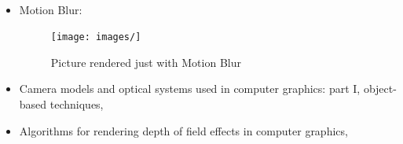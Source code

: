 \documentclass[11pt,a4paper]{article}
\begin{document}
\\
\begin{itemize}
\item
Motion Blur:\\
\begin{figure}[h]
\begin{center}
\texttt{[image: images/]}
\caption[Picture showing Motion Blur]{Picture rendered just with Motion Blur}
\label{fig:2}
\end{center}
\end{figure}
\item
Camera models and optical systems used in computer graphics: part I, object-based techniques, \cite{barsky2003camera}
\item
Algorithms for rendering depth of field effects in computer graphics, \cite{barsky2008algorithms}

\end{itemize}



\end{document}
